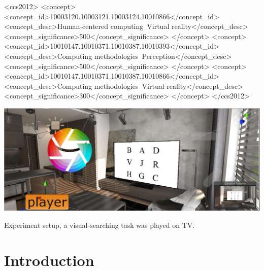 \documentclass[sigconf]{acmart}
\begin{document}
\begin{CCSXML}
<ccs2012>
<concept>
<concept_id>10003120.10003121.10003124.10010866</concept_id>
<concept_desc>Human-centered computing~Virtual reality</concept_desc>
<concept_significance>500</concept_significance>
</concept>
<concept>
<concept_id>10010147.10010371.10010387.10010393</concept_id>
<concept_desc>Computing methodologies~Perception</concept_desc>
<concept_significance>500</concept_significance>
</concept>
<concept>
<concept_id>10010147.10010371.10010387.10010866</concept_id>
<concept_desc>Computing methodologies~Virtual reality</concept_desc>
<concept_significance>300</concept_significance>
</concept>
</ccs2012>
\end{CCSXML}



\begin{teaserfigure}
  \centering
  \includegraphics[width=6.0in]{aaafiles/environments_b}
  \caption{Experiment setup, a visual-searching task was played on TV.}
\end{teaserfigure}

\maketitle

\section{Introduction}

\end{document}
